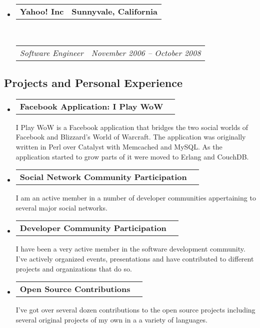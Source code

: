 \documentclass[10pt,letterpaper]{article}
\makeatletter
\newcommand{\headerrow}[2]
{\begin{tabular*}{\linewidth}{l@{\extracolsep{\fill}}r}
  #1 &
  #2 \\
\end{tabular*}}
\makeatother
\begin{document}
\begin{itemize}
  \item
  \headerrow
    {\textbf{Yahoo! Inc}}
    {\textbf{Sunnyvale, California}}
  \\
  \headerrow
    {\emph{Software Engineer}}
    {\emph{November 2006 -- October 2008}}
\end{itemize}

\vspace{-0.4em}
\subsection*{Projects and Personal Experience}

\begin{itemize}
  \parskip=0.1em

  \item
  \headerrow
    {\textbf{Facebook Application: I Play WoW}}
    {\textbf{}}
    I Play WoW is a Facebook application that bridges the two social worlds of Facebook and Blizzard's World of Warcraft. The application was originally written in Perl over Catalyst with Memcached and MySQL. As the application started to grow parts of it were moved to Erlang and CouchDB.
  \item
  \headerrow
    {\textbf{Social Network Community Participation}}
    {\textbf{}}
    I am an active member in a number of developer communities appertaining to several major social networks.
  \item
  \headerrow
    {\textbf{Developer Community Participation}}
    {\textbf{}}
    I have been a very active member in the software development community. I've actively organized events, presentations and have contributed to different projects and organizations that do so.
  \item
  \headerrow
    {\textbf{Open Source Contributions}}
    {\textbf{}}
    I've got over several dozen contributions to the open source projects including several original projects of my own in a a variety of languages.

\end{itemize}
\end{document}
